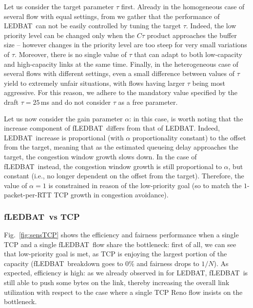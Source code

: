 \documentclass[conference]{IEEEtran}
\newcommand{\figR}[1]{Fig.~\ref{fig:#1}}
\newcommand{\btledbat}[0]{LEDBAT}
\newcommand{\fledbat}[0]{fLEDBAT}
\begin{document}
Let us consider the target parameter $\tau$ first.
Already in the homogeneous case of several flow with equal settings, from \cite{lcn10} we gather that the performance of \btledbat\ can not  be easily controlled by tuning the target $\tau$. Indeed, the low priority level can be changed only when the  $C \tau$  product approaches the buffer size -- however changes in the priority level are too steep for very small variations of $\tau$. Moreover, there is no single value of $\tau$ that can adapt to both low-capacity and high-capacity links at the same time.
Finally, in the heterogeneous case of several flows with different settings, even a small difference between values of $\tau$ yield to extremely unfair situations, with flows having larger $\tau$ being most aggressive. For this reason,  we adhere to the mandatory value specified by the draft  $\tau=25$\,ms and do not consider $\tau$ as a free parameter.

Let us now consider the gain parameter $\alpha$: in this case, is worth noting that the increase component of \fledbat\ differs from that of \btledbat. Indeed, \btledbat\ increase is proportional (with $\alpha$ proportionality constant) to the offset from the target, meaning that as the estimated queueing delay approaches the target, the congestion window growth slows down. In the case of \fledbat\ instead, the congestion window growth is still proportional to $\alpha$, but constant (i.e., no longer dependent on the offset from the target). Therefore, the value of $\alpha=1$ is constrained in reason of the low-priority goal (so to match the $1$-packet-per-RTT TCP growth in congestion avoidance).



\subsubsection{\fledbat\ vs TCP}


\figR{sensTCP} shows the efficiency and fairness performance when a single
TCP and a single \fledbat\ flow share the bottleneck: first of all, we can see that low-priority goal is met, as TCP is enjoying the largest portion of the capacity (\fledbat\ breakdown goes to 0\% and fairness drops to $1/N$).
As expected, efficiency is high: as we already observed in \cite{icccn10} for \btledbat, \fledbat\ is still able to push some bytes on the link, thereby increasing the overall link utilization with respect to the case where a single TCP Reno flow insists on the bottleneck.
\end{document}
